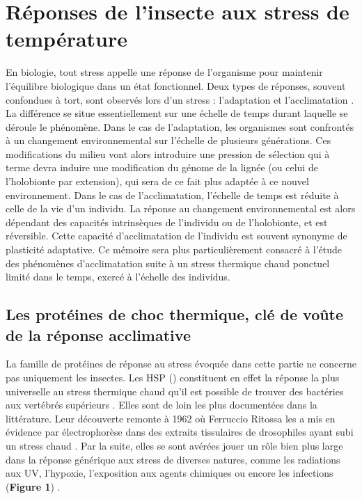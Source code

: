 \section{Réponses de l'insecte aux stress de température}

En biologie, tout stress appelle une réponse de l'organisme pour maintenir l'équilibre biologique dans un état fonctionnel.
Deux types de réponses, souvent confondues à tort, sont observés lors d'un stress : l'adaptation et l'acclimatation \cite{somero2010}.
La différence se situe essentiellement sur une échelle de temps durant laquelle se déroule le phénomène.
Dans le cas de l'adaptation, les organismes sont confrontés à un changement environnemental sur l'échelle de plusieurs générations.
Ces modifications du milieu vont alors introduire une pression de sélection qui à terme devra induire une modification du génome de la lignée (ou celui de l'holobionte par extension), qui sera de ce fait plus adaptée à ce nouvel environnement.
Dans le cas de l'acclimatation, l'échelle de temps est réduite à celle de la vie d'un individu. La réponse au changement environnemental est alors dépendant des capacités intrinsèques de l'individu ou de l'holobionte, et est réversible.
Cette capacité d'acclimatation de l'individu est souvent synonyme de plasticité adaptative.
Ce mémoire sera plus particulièrement consacré à l'étude des phénomènes d'acclimatation suite à un stress thermique chaud ponctuel limité dans le temps, exercé à l'échelle des individus.

	\subsection{Les protéines de choc thermique, clé de voûte de la réponse acclimative}

	La famille de protéines de réponse au stress évoquée dans cette partie ne concerne pas uniquement les insectes.
	Les HSP () constituent en effet la réponse la plus universelle au stress thermique chaud qu'il est possible de trouver des bactéries aux vertébrés supérieurs \cite{lindquist1986}.
	Elles sont de loin les plus documentées dans la littérature.
	Leur découverte remonte à 1962 où Ferruccio Ritossa les a mis en évidence par électrophorèse dans des extraits tissulaires de drosophiles ayant subi un stress chaud \cite{ritossa1996, ritossa1962}. %
	Par la suite, elles se sont avérées jouer un rôle bien plus large dans la réponse générique aux stress de diverses natures, comme les radiations aux UV, l'hypoxie, l'exposition aux agents chimiques ou encore les infections (\textbf{Figure 1}) \cite{sorensen2003}.

